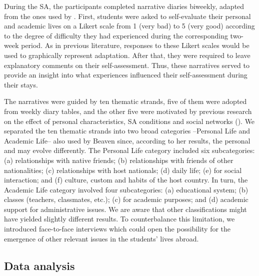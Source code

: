 \documentclass[output=paper]{langsci/langscibook}
\begin{document}
During the SA, the participants completed narrative diaries biweekly, adapted from the ones used by \citet{Beaven2012}. First, students were asked to self-evaluate their personal and academic lives on a Likert scale from 1 (very bad) to 5 (very good) according to the degree of difficulty they had experienced during the corresponding two-week period. As in previous literature, responses to these Likert scales would be used to graphically represent adaptation. After that, they were required to leave explanatory comments on their self-assessment. Thus, these narratives served to provide an insight into what experiences influenced their self-assessment during their stays. 

The narratives were guided by ten thematic strands, five of them were adopted from  weekly diary tables, and the other five were motivated by previous research on the effect of personal characteristics, SA conditions and social networks (\citealt{VandeBergEtAl2009,Pitts2009,Coleman2015}). We separated the ten thematic strands into two broad categories –Personal Life and Academic Life– also used by Beaven since, according to her results, the personal and  may evolve differently. The Personal Life category included six subcategories: (a) relationships with native friends; (b) relationships with friends of other nationalities; (c) relationships with host nationals; (d) daily life; (e)  for social interaction; and (f) culture, custom and habits of the host country. In turn, the Academic Life category involved four subcategories: (a) educational system; (b) classes (teachers, classmates, etc.); (c)  for academic purposes; and (d) academic support for administrative issues. We are aware that other classifications might have yielded slightly different results. To counterbalance this limitation, we introduced face-to-face interviews which could open the possibility for the emergence of other relevant issues in the students’ lives abroad.


 
\subsection{Data analysis}
 
\end{document}
